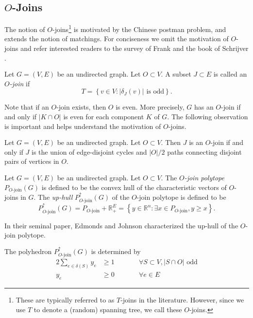 \documentclass[letterpaper, reqno,12pt]{article}
\newcommand{\RR}{\mathbb{R}}
\begin{document}
\subsection{$O$-Joins}

The notion of $O$-joins\footnote{These are typically referred to as $T$-joins in the literature. However, since we use $T$ to denote a (random) spanning tree, we call these $O$-joins.} is motivated by the Chinese postman problem, and extends the notion of matchings. For conciseness we omit the motivation of $O$-joins and refer interested readers to the survey of Frank \cite{as1994survey} and the book of Schrijver \cite{schrijver2003combinatorial}.

\begin{definition}
  Let $G = (V, E)$ be an undirected graph. Let $O \subset V$. A subset $J \subset E$ is called an \emph{$O$-join} if
  $$ T = \left\{ v \in V : \left|\delta_J(v)\right| \text{ is odd} \right\}. $$
\end{definition}

Note that if an $O$-join exists, then $O$ is even. More precisely, $G$ has an $O$-join if and only if $|K \cap O|$ is even for each component $K$ of $G$. The following observation is important and helps understand the motivation of $O$-joins.

\begin{proposition}
  Let $G = (V, E)$ be an undirected graph. Let $O \subset V$. Then $J$ is an $O$-join if and only if $J$ is the union of edge-disjoint cycles and $|O|/2$ paths connecting disjoint pairs of vertices in $O$.
\end{proposition}

\begin{definition}
  Let $G = (V, E)$ be an undirected graph. Let $O \subset V$. The \emph{$O$-join polytope} $P_\text{$O$-join}(G)$ is defined to be the convex hull of the characteristic vectors of $O$-joins in $G$. The \emph{up-hull} $P_\text{$O$-join}^\uparrow(G)$ of the $O$-join polytope is defined to be
  $$ P_\text{$O$-join}^\uparrow(G) = P_\text{$O$-join} + \RR_+^E = \left\{ y \in \RR^n : \exists x \in P_\text{$O$-join}, y \geq x \right\}. $$
\end{definition}

In their seminal paper, Edmonds and Johnson \cite{edmonds1973matching} characterized the up-hull of the $O$-join polytope.

\begin{theorem}
  The polyhedron $P_\text{$O$-join}^\uparrow(G)$ is determined by
  \begin{alignat*}{2}
    \sum_{e \in \delta(S)} y_e &\geq 1 && \qquad \forall S \subset V, |S \cap O| \text{ odd} \\
    y_e &\geq 0 && \qquad \forall e \in E
  \end{alignat*}
\end{theorem}
\end{document}
